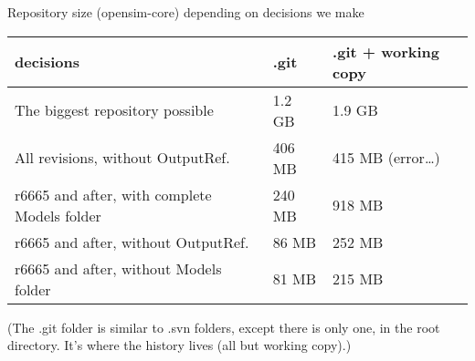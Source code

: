 \documentclass[pdf, 8pt]{beamer}
\begin{document}
\begin{frame}[fragile]{Repository size (opensim-core) depending on decisions we make}
\begin{tabular}{lll}
    decisions & .git & .git + working copy \\ \hline
    The biggest repository possible & 1.2 GB &1.9 GB \\
    All revisions, without OutputRef. & 406 MB & 415 MB (error\ldots) \\
    r6665 and after, with complete Models folder & 240 MB & 918 MB \\
    r6665 and after, without OutputRef. & 86 MB & 252 MB \\
    r6665 and after, without Models folder & 81 MB & 215 MB \\
\end{tabular}


    \vspace{1cm}
    \vspace{1cm}

    (The .git folder is similar to .svn folders, except there is only one, in
    the root directory. It's where the history lives (all but working copy).)
\end{frame}
\end{document}
